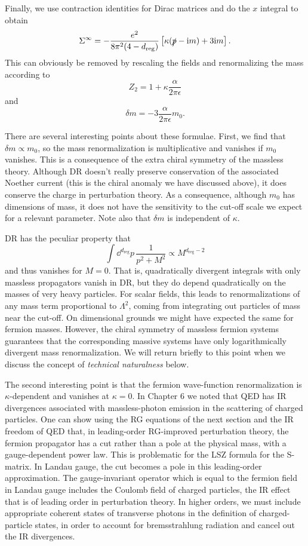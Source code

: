 Finally, we use contraction identities for Dirac matrices and do the $x$
integral to obtain
\[
  \Sigma^\infty=-\frac{e^2}{8\pi^2(4-d_{\mathrm{reg}})}
  \left[\kappa(\slashed p-\mathrm{i} m)+3\mathrm{i} m\right].
\]
This can obviously be removed by rescaling the fields and renormalizing the
mass according to
\[
  Z_2=1+\kappa\frac{\alpha}{2\pi\epsilon}
\]
and
\[
  \delta m=-3\frac{\alpha}{2\pi\epsilon}m_0.
\]

There are several interesting points about these formulae. First, we find that
$\delta m\propto m_0$, so the mass renormalization is multiplicative and
vanishes if $m_0$ vanishes. This is a consequence of the extra chiral symmetry
of the massless theory. Although DR doesn't really preserve conservation of the
associated Noether current (this is the chiral anomaly we have discussed above),
it does conserve the charge in perturbation theory. As a consequence, although
$m_0$ has dimensions of mass, it does not have the sensitivity to the cut-off
scale we expect for a relevant parameter. Note also that $\delta m$ is
independent of $\kappa$.

DR has the peculiar property that
\[
  \int\dd^{d_{\mathrm{reg}}}p\,\frac{1}{p^2+M^2}\propto M^{d_{\mathrm{reg}}-2}
\]
and thus vanishes for $M=0$. That is, quadratically divergent integrals with
only massless propagators vanish in DR, but they do depend quadratically on the
masses of very heavy particles. For scalar fields, this leads to renormalizations
of any mass term proportional to $\Lambda^2$, coming from integrating out
particles of mass near the cut-off. On dimensional grounds we might have
expected the same for fermion masses. However, the chiral symmetry of massless
fermion systems guarantees that the corresponding massive systems have only
logarithmically divergent mass renormalization. We will return briefly to this
point when we discuss the concept of \emph{technical naturalness} below.

The second interesting point is that the fermion wave-function renormalization
is $\kappa$-dependent and vanishes at $\kappa=0$. In Chapter 6 we noted that
QED has IR divergences associated with massless-photon emission in the
scattering of charged particles. One can show using the RG equations of the
next section and the IR freedom of QED that, in leading-order RG-improved
perturbation theory, the fermion propagator has a cut rather than a pole at the
physical mass, with a gauge-dependent power law. This is problematic for the LSZ
formula for the S-matrix. In Landau gauge, the cut becomes a pole in this
leading-order approximation. The gauge-invariant operator which is equal to the
fermion field in Landau gauge includes the Coulomb field of charged particles,
the IR effect that is of leading order in perturbation theory. In higher orders,
we must include appropriate coherent states of transverse photons in the
definition of charged-particle states, in order to account for bremsstrahlung
radiation and cancel out the IR divergences.
